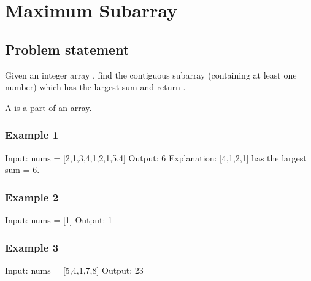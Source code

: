 \documentclass[letterpaper,12pt,english]{book}
\begin{document}
\sphinxstepscope


\section{Maximum Subarray}
\label{\detokenize{Prefix_Sum/53_Maximum_Subarray:maximum-subarray}}\label{\detokenize{Prefix_Sum/53_Maximum_Subarray::doc}}

\subsection{Problem statement\sphinxfootnotemark[104]}
\label{\detokenize{Prefix_Sum/53_Maximum_Subarray:problem-statement}}%
\begin{footnotetext}[104]\sphinxAtStartFootnote
{}
%
\end{footnotetext}\ignorespaces 
\sphinxAtStartPar
Given an integer array , find the contiguous subarray (containing at least one number) which has the largest sum and return .

\sphinxAtStartPar
A  is a  part of an array.


\subsubsection{Example 1}
\label{\detokenize{Prefix_Sum/53_Maximum_Subarray:example-1}}
\begin{sphinxVerbatim}[commandchars=\\\{\}]
Input: nums = [\PYGZhy{}2,1,\PYGZhy{}3,4,\PYGZhy{}1,2,1,\PYGZhy{}5,4]
Output: 6
Explanation: [4,\PYGZhy{}1,2,1] has the largest sum = 6.
\end{sphinxVerbatim}


\subsubsection{Example 2}
\label{\detokenize{Prefix_Sum/53_Maximum_Subarray:example-2}}
\begin{sphinxVerbatim}[commandchars=\\\{\}]
Input: nums = [1]
Output: 1
\end{sphinxVerbatim}


\subsubsection{Example 3}
\label{\detokenize{Prefix_Sum/53_Maximum_Subarray:example-3}}
\begin{sphinxVerbatim}[commandchars=\\\{\}]
Input: nums = [5,4,\PYGZhy{}1,7,8]
Output: 23
\end{sphinxVerbatim}
\end{document}
